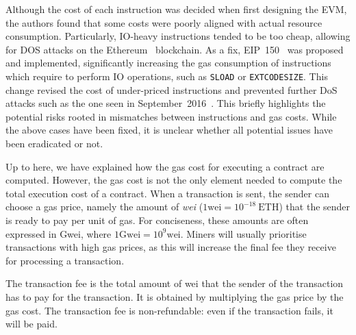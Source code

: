 Although the cost of each instruction was decided when first designing the EVM, the authors found that some costs were poorly aligned with actual resource consumption. Particularly, IO-heavy instructions tended to be too cheap, allowing for DOS attacks on the Ethereum~\cite{suicide-attack} blockchain. As a fix, EIP~150~\cite{erc150} was proposed and implemented, significantly increasing the gas consumption of instructions which require to perform IO operations, such as \lstinline{SLOAD} or \lstinline{EXTCODESIZE}. This change revised the cost of under-priced instructions and prevented further DoS attacks such as the one seen in September~2016~\cite{transaction-spam-attack}. This briefly highlights the potential risks rooted in mismatches between instructions and gas costs. While the above cases have been fixed, it is unclear whether all potential issues have been eradicated or not.

 Up to here, we have explained how the gas cost for executing a contract are computed. However, the gas cost is not the only element needed to compute the total execution cost of a contract. When a transaction is sent, the sender can choose a gas price, namely the amount of \emph{wei} ($1\text{wei} = 10^{-18}~\text{ETH}$) that the sender is ready to pay per unit of gas. For conciseness, these amounts are often expressed in Gwei, where $1\text{Gwei} = 10^9\text{wei}$. Miners will usually prioritise transactions with high gas prices, as this will increase the final fee they receive for processing a transaction.

The transaction fee is the total amount of wei that the sender of the transaction has to pay for the transaction. It is obtained by multiplying the gas price by the gas cost. The transaction fee is non-refundable: even if the transaction fails, it will be paid.

